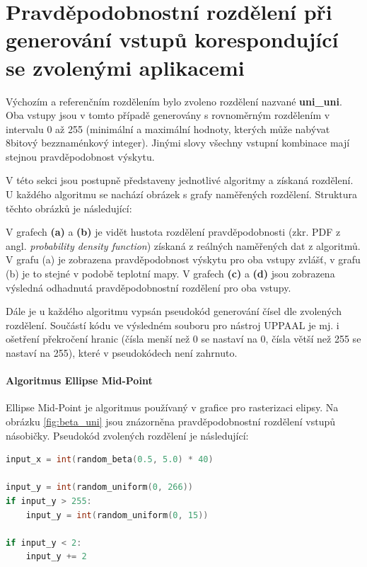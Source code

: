 \chapter{Pravděpodobnostní rozdělení při generování vstupů korespondující se zvolenými aplikacemi} \label{append:rozdeleni_pst}
Výchozím a referenčním rozdělením bylo zvoleno rozdělení nazvané \textbf{uni\_uni}. Oba vstupy jsou v tomto případě generovány s rovnoměrným rozdělením v intervalu 0 až 255 (minimální a maximální hodnoty, kterých může nabývat 8bitový bezznaménkový integer). Jinými slovy všechny vstupní kombinace mají stejnou pravděpodobnost výskytu.

V této sekci jsou postupně představeny jednotlivé algoritmy a získaná rozdělení. U každého algoritmu se nachází obrázek s grafy naměřených rozdělení. Struktura těchto obrázků je následující:

V grafech \textbf{(a)} a \textbf{(b)} je vidět hustota rozdělení pravděpodobnosti (zkr. PDF z angl. \textit{probability density function}) získaná z reálných naměřených dat z algoritmů. V grafu (a) je zobrazena pravděpodobnost výskytu pro oba vstupy zvlášť, v grafu (b) je to stejné v podobě teplotní mapy. V grafech \textbf{(c)} a \textbf{(d)} jsou zobrazena výsledná odhadnutá pravděpodobnostní rozdělení pro oba vstupy.

Dále je u každého algoritmu vypsán pseudokód generování čísel dle zvolených rozdělení. Součástí kódu ve výsledném souboru pro nástroj UPPAAL je mj. i ošetření překročení hranic (čísla menší než 0 se nastaví na 0, čísla větší než 255 se nastaví na 255), které v pseudokódech není zahrnuto.

\pagebreak

\subsubsection{Algoritmus Ellipse Mid-Point}
Ellipse Mid-Point je algoritmus používaný v grafice pro rasterizaci elipsy. Na obrázku \ref{fig:beta_uni} jsou znázorněna pravděpodobnostní rozdělení vstupů násobičky. Pseudokód zvolených rozdělení je následující:

\begin{lstlisting}[language={C}, label={lst:ellipse}]
input_x = int(random_beta(0.5, 5.0) * 40)

input_y = int(random_uniform(0, 266))
if input_y > 255:
    input_y = int(random_uniform(0, 15))

if input_y < 2:
    input_y += 2
\end{lstlisting}

